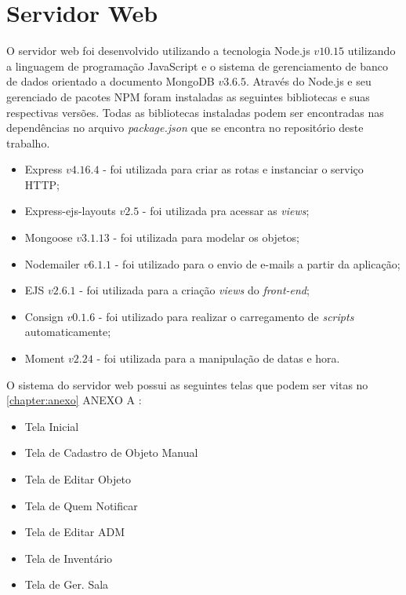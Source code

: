 \section{Servidor Web}

O servidor web foi desenvolvido utilizando a tecnologia Node.js $v10.15$ utilizando a linguagem de programação JavaScript e o sistema de gerenciamento de banco de dados orientado a documento MongoDB $v3.6.5$. Através do Node.js e seu gerenciado de pacotes NPM foram instaladas as seguintes bibliotecas e suas respectivas versões. Todas as bibliotecas instaladas podem ser encontradas nas dependências no arquivo \textit{package.json} que se encontra no repositório deste trabalho. 

\begin{itemize}
    \item Express $v4.16.4$ - foi utilizada para criar as rotas e instanciar o serviço HTTP;
    \item Express-ejs-layouts $v2.5$ - foi utilizada pra acessar as \textit{views}; 
    \item Mongoose $v3.1.13$ - foi utilizada para modelar os objetos;
    \item Nodemailer $v6.1.1$ - foi utilizado para o envio de e-mails a partir da aplicação;
    \item EJS $v2.6.1$ - foi utilizada para a criação \textit{views} do \textit{front-end};
    \item Consign $v0.1.6$ - foi utilizado para realizar o carregamento de \textit{scripts} automaticamente;
    \item Moment $v2.24$ - foi utilizada para a manipulação de datas e hora.
\end{itemize}





\par 
O sistema do servidor web possui as seguintes telas que podem ser vitas no \autoref{chapter:anexo} ANEXO A :
\begin{itemize}
    \item Tela Inicial
    \item Tela de Cadastro de Objeto Manual
    \item Tela de Editar Objeto
    \item Tela de Quem Notificar
    \item Tela de Editar ADM
    \item Tela de Inventário
    \item Tela de Ger. Sala
\end{itemize}    

